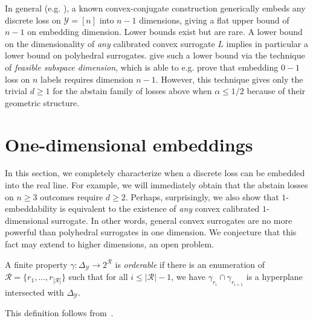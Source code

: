 \documentclass[anon]{colt2020} %
\newcommand{\simplex}{\Delta_\Y}
\newcommand{\R}{\mathcal{R}}
\newcommand{\Y}{\mathcal{Y}}
\begin{document}
In general (e.g. \cite{finocchiaro2019embedding}), a known convex-conjugate construction generically embeds any discrete loss on $\Y = [n]$ into $n-1$ dimensions, giving a flat upper bound of $n-1$ on embedding dimension.
Lower bounds exist but are rare.
A lower bound on the dimensionality of \emph{any} calibrated convex surrogate $L$ implies in particular a lower bound on polyhedral surrogates.
\cite{ramaswamy2016convex} give such a lower bound via the technique of \emph{feasible subspace dimension}, which is able to e.g. prove that embedding $0-1$ loss on $n$ labels requires dimension $n-1$.
However, this technique gives only the trivial $d \geq 1$ for the abstain family of losses above when $\alpha \leq 1/2$ because of their geometric structure.


\section{One-dimensional embeddings}
\label{sec:1d}

In this section, we completely characterize when a discrete loss can be embedded into the real line.
For example, we will immediately obtain that the abstain losses on $n \geq 3$ outcomes require $d \geq 2$.
Perhaps, surprisingly, we also show that $1$-embeddability is equivalent to the existence of \emph{any} convex calibrated $1$-dimensional surrogate.
In other words, general convex surrogates are no more powerful than polyhedral surrogates in one dimension.
We conjecture that this fact may extend to higher dimensions, an open problem.

\begin{definition}[Orderable]\label{def:orderable-hyperplane}
	A finite property $\gamma:\simplex \to 2^\R$ is \emph{orderable} if there is an enumeration of $\R = \{r_1, \ldots, r_{|\R|}\}$ such that for all $i \leq |\R| - 1$, we have $\gamma_{r_i} \cap \gamma_{r_{i+1}}$ is a hyperplane intersected with $\simplex$.
\end{definition}
This definition follows from~\cite[Theorem 3]{lambert2018elicitation}.
\end{document}
